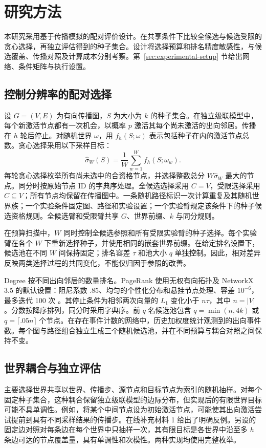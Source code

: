 \documentclass[smallextended]{svjour3}
\begin{document}
\section{研究方法}
本研究采用基于传播模拟的配对评价设计。在共享条件下比较全候选与候选受限的贪心选择，再独立评估得到的种子集合。设计将选择预算和排名精度敏感性，与候选覆盖、传播对照及计算成本分别考察。第~\ref{sec:experimental-setup} 节给出网络、条件矩阵与执行设置。
\subsection{控制分辨率的配对选择}
设 $G=(V,E)$ 为有向传播图，$S$ 为大小为 $k$ 的种子集合。在独立级联模型中，每个新激活节点都有一次机会，以概率 $p$ 激活其每个尚未激活的出向邻居。传播在 $h$ 轮后停止。对随机世界 $\omega$，用 $f_h(S;\omega)$ 表示包括种子在内的激活节点总数。贪心选择采用以下采样目标：
\begin{equation}
\widehat\sigma_W(S)=\frac{1}{W}\sum_{w=1}^{W}f_h(S;\omega_w).
\end{equation}
每轮贪心选择枚举所有尚未选中的合资格节点，并选择整数总分 $W\widehat\sigma_W$ 最大的节点。同分时按原始节点 ID 的字典序处理。全候选选择采用 $C=V$，受限选择采用 $C\subseteq V$；所有节点均保留在传播图中。一条随机路径标识一次计算重复及其随机世界族；一个实验条件固定图、路径和实验设置；一个实验臂规定该条件下的种子候选资格规则。全候选臂和受限臂共享 $G$、世界前缀、$k$ 与同分规则。

在预算扫描中，$W$ 同时控制全候选参照和所有受限实验臂的种子选择。每个实验臂在各个 $W$ 下重新选择种子，并使用相同的嵌套世界前缀。在给定排名设置下，候选池在不同 $W$ 间保持固定；排名容差 $\tau$ 和池大小 $q$ 单独控制。因此，相对差异反映两类选择过程的共同变化，不能仅归因于参照的改善。

Degree 按不同出向邻居的数量排名。PageRank 使用无权有向拓扑及 NetworkX 3.5 的默认设置：阻尼系数 .85、均匀的个性化分布和悬挂节点处理、容差 $10^{-6}$，最多迭代 100 次 \cite{networkxpr}。其停止条件为相邻两次向量的 $L_1$ 变化小于 $n\tau$，其中 $n=|V|$。分数按降序排列，同分时采用字典序。前 $q$ 名候选池包含 $q=\min(n,4k)$ 或 $q=\lceil .05n\rceil$ 个节点。在存在事件计数的网络中，历史加权度统计观测到的出向事件数。每个图与路径组合独立生成三个随机候选池，并在不同预算与耦合对照之间保持不变。

\subsection{世界耦合与独立评估}\label{sec:coupling}
主要选择世界共享以世界、传播步、源节点和目标节点为索引的随机抽样。对每个固定种子集合，这种耦合保留独立级联模型的边际分布，但实现后的有限世界目标可能不具单调性。例如，将某个中间节点设为初始激活节点，可能使其出向激活尝试提前到具有不同采样结果的传播步。在线补充材料 1 给出了明确反例。另设的固定边对照对每条边在每个世界中只抽样一次，其有限目标是各世界中沿至多 $h$ 条边可达的节点覆盖量，具有单调性和次模性。两种实现均使用完整枚举。
\end{document}
